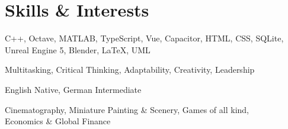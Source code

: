 \documentclass[10pt]{article} %
\begin{document}
\section{Skills \& Interests}
\begin{description}[style=multiline, leftmargin=2.75cm]
    \item[Technical] {C++, Octave, MATLAB, TypeScript, Vue, Capacitor, HTML, CSS, SQLite, 
        Unreal Engine 5, Blender, LaTeX, UML}
    \item[Soft] Multitasking, Critical Thinking, Adaptability, Creativity, Leadership 
    \item[Languages] English Native, German Intermediate
    \item[Interests] {Cinematography, Miniature Painting \& Scenery, 
        Games of all kind, \\ Economics \& Global Finance}
\end{description}
\end{document}
